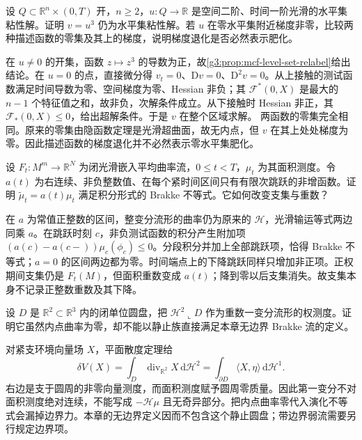 \begin{exercise}\label{g3:ex:mcf-level-relabel}
	设 \(Q\subset\mathbb R^n\times(0,T)\) 开，\(n\ge2\)，\(u:Q\to\mathbb R\) 是空间二阶、时间一阶光滑的水平集粘性解。证明 \(v=u^3\) 仍为水平集粘性解。若 \(u\) 在零水平集附近梯度非零，比较两种描述函数的零集及其上的梯度，说明梯度退化是否必然表示肥化。
\end{exercise}
\begin{solution}
	在 \(u\ne0\) 的开集，函数 \(z\mapsto z^3\) 的导数为正，故\cref{g3:prop:mcf-level-set-relabel}给出结论。在 \(u=0\) 的点，直接微分得 \(v_t=0\)、\(\mathrm Dv=0\)、\(\mathrm D^2v=0\)。从上接触的测试函数满足时间导数为零、空间梯度为零、Hessian 非负；其 \(\mathcal F^*(0,X)\) 是最大的 \(n-1\) 个特征值之和，故非负，次解条件成立。从下接触时 Hessian 非正，其 \(\mathcal F_*(0,X)\le0\)，给出超解条件。于是 \(v\) 在整个区域求解。
	两函数的零集完全相同。原来的零集由隐函数定理是光滑超曲面，故无内点，但 \(v\) 在其上处处梯度为零。因此描述函数的梯度退化并不必然表示零水平集肥化。
\end{solution}

\begin{exercise}\label{g3:ex:mcf-brakke-weight-jumps}
	设 \(F_t:M^m\to\mathbb R^N\) 为闭光滑嵌入平均曲率流，\(0\le t<T\)，\(\mu_t\) 为其面积测度。令 \(a(t)\) 为右连续、非负整数值、在每个紧时间区间只有有限次跳跃的非增函数。证明 \(\widetilde\mu_t=a(t)\mu_t\) 满足积分形式的 Brakke 不等式。它如何改变支集与重数？
\end{exercise}
\begin{solution}
	在 \(a\) 为常值正整数的区间，整变分流形的曲率仍为原来的 \(\mathcal H\)，光滑输运等式两边同乘 \(a\)。在跳跃时刻 \(c\)，非负测试函数的积分产生附加项
	\((a(c)-a(c-))\mu_c(\phi_c)\le0\)。分段积分并加上全部跳跃项，恰得 Brakke 不等式；\(a=0\) 的区间两边都为零。时间端点上的下降跳跃同样只增加非正项。正权期间支集仍是 \(F_t(M)\)，但面积重数变成 \(a(t)\)；降到零以后支集消失。故支集本身不记录正整数重数及其下降。
\end{solution}

\begin{exercise}\label{g3:ex:mcf-boundary-varifold}
	设 \(D\) 是 \(\mathbb R^2\subset\mathbb R^3\) 内的闭单位圆盘，把 \(\mathcal H^2\llcorner D\) 作为重数一变分流形的权测度。证明它虽然内点曲率为零，却不能以静止族直接满足本章无边界 Brakke 流的定义。
\end{exercise}
\begin{solution}
	对紧支环境向量场 \(X\)，平面散度定理给
	\[
		\delta V(X)=\int_D\operatorname{div}_{\mathbb R^2}X\,\mathrm d\mathcal H^2
		=\int_{\partial D}\langle X,\eta\rangle\,\mathrm d\mathcal H^1.
	\]
	右边是支于圆周的非零向量测度，而面积测度赋予圆周零质量。因此第一变分不对面积测度绝对连续，不能写成 \(-\mathcal H\mu\) 且无奇异部分。把内点曲率零代入演化不等式会漏掉边界力。本章的无边界定义因而不包含这个静止圆盘；带边界弱流需要另行规定边界项。
\end{solution}
